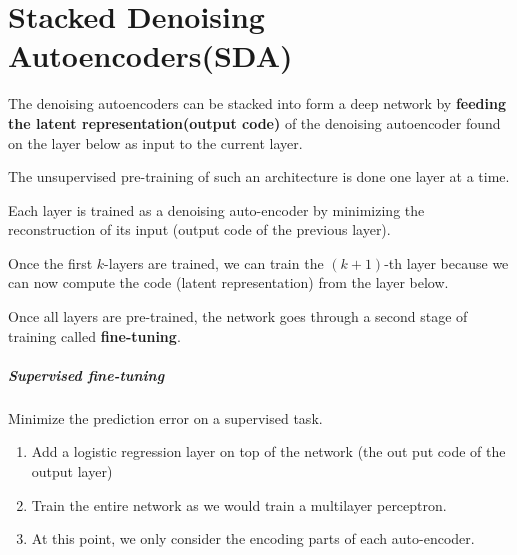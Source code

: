 \chapter{Stacked Denoising Autoencoders(SDA)}
The denoising autoencoders can be stacked into form a deep network by
\textbf{feeding the latent representation(output code)} of the denoising
autoencoder found on the layer below as input to the current layer.

The unsupervised pre-training of such an architecture is done one layer at
a time. 

Each layer is trained as a denoising auto-encoder by minimizing
the reconstruction of its input (output code of the previous layer).

Once the first $k$-layers are trained, we can train the $(k+1)$-th layer
because we can now compute the code (latent representation) from the layer
below.

Once all layers are pre-trained, the network goes through a second stage
of training called \textbf{fine-tuning}.

\paragraph{Supervised fine-tuning} Minimize the prediction error on a
supervised task. 
\begin{enumerate}
    \item Add a logistic regression layer on top of the network (the out
        put code of the output layer)
    \item Train the entire network as we would train a multilayer
        perceptron. 
    \item At this point, we only consider the encoding parts of each
        auto-encoder.
\end{enumerate}

